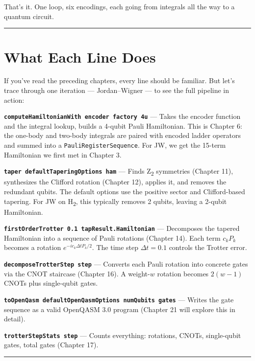\documentclass[
  11pt,
  oneside]{book}
\begin{document}
That's it. One loop, six encodings, each going from integrals all the
way to a quantum circuit.

\begin{center}\rule{0.5\linewidth}{0.5pt}\end{center}

\section{What Each Line Does}\label{what-each-line-does}

If you've read the preceding chapters, every line should be familiar.
But let's trace through one iteration --- Jordan--Wigner --- to see the
full pipeline in action:

\textbf{\texttt{computeHamiltonianWith\ encoder\ factory\ 4u}} --- Takes
the encoder function and the integral lookup, builds a 4-qubit Pauli
Hamiltonian. This is Chapter 6: the one-body and two-body integrals are
paired with encoded ladder operators and summed into a
\texttt{PauliRegisterSequence}. For JW, we get the 15-term Hamiltonian
we first met in Chapter 3.

\textbf{\texttt{taper\ defaultTaperingOptions\ ham}} --- Finds Z\textsubscript{2}
symmetries (Chapter 11), synthesizes the Clifford rotation (Chapter 12),
applies it, and removes the redundant qubits. The default options use
the positive sector and Clifford-based tapering. For JW on H\textsubscript{2}, this
typically removes 2 qubits, leaving a 2-qubit Hamiltonian.

\textbf{\texttt{firstOrderTrotter\ 0.1\ tapResult.Hamiltonian}} ---
Decomposes the tapered Hamiltonian into a sequence of Pauli rotations
(Chapter 14). Each term \(c_k P_k\) becomes a rotation
\(e^{-i c_k \Delta t P_k / 2}\). The time step \(\Delta t = 0.1\)
controls the Trotter error.

\textbf{\texttt{decomposeTrotterStep\ step}} --- Converts each Pauli
rotation into concrete gates via the CNOT staircase (Chapter 16). A
weight-\(w\) rotation becomes \(2(w-1)\) CNOTs plus single-qubit gates.

\textbf{\texttt{toOpenQasm\ defaultOpenQasmOptions\ numQubits\ gates}}
--- Writes the gate sequence as a valid OpenQASM 3.0 program (Chapter 21
will explore this in detail).

\textbf{\texttt{trotterStepStats\ step}} --- Counts everything:
rotations, CNOTs, single-qubit gates, total gates (Chapter 17).

\begin{center}\rule{0.5\linewidth}{0.5pt}\end{center}
\end{document}
